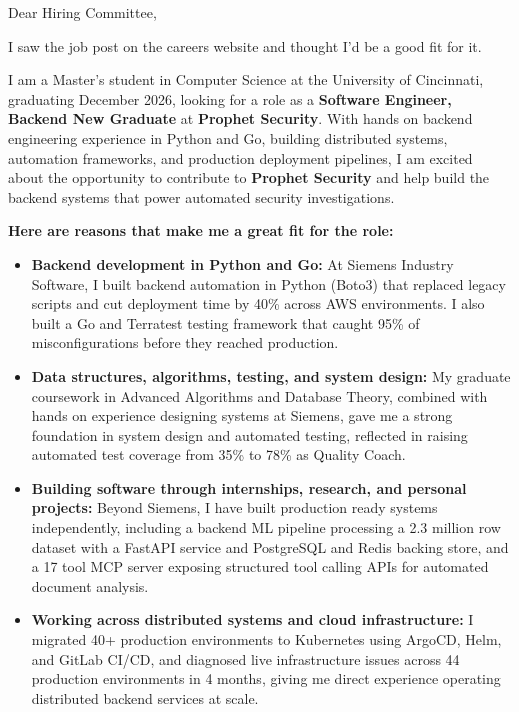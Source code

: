 \documentclass[11pt]{letter}
\date{}
\begin{document}
\begin{letter}{}

\opening{Dear Hiring Committee,}

I saw the job post on the careers website and thought I'd be a good fit for it.

I am a Master's student in Computer Science at the University of Cincinnati, graduating December 2026, looking for a role as a \textbf{Software Engineer, Backend New Graduate} at \textbf{Prophet Security}. With hands on backend engineering experience in Python and Go, building distributed systems, automation frameworks, and production deployment pipelines, I am excited about the opportunity to contribute to \textbf{Prophet Security} and help build the backend systems that power automated security investigations.

\textbf{Here are reasons that make me a great fit for the role:}

\begin{itemize}[leftmargin=*, itemsep=0.45em]
    \item \textbf{Backend development in Python and Go:} At Siemens Industry Software, I built backend automation in Python (Boto3) that replaced legacy scripts and cut deployment time by 40\% across AWS environments. I also built a Go and Terratest testing framework that caught 95\% of misconfigurations before they reached production.

    \item \textbf{Data structures, algorithms, testing, and system design:} My graduate coursework in Advanced Algorithms and Database Theory, combined with hands on experience designing systems at Siemens, gave me a strong foundation in system design and automated testing, reflected in raising automated test coverage from 35\% to 78\% as Quality Coach.

    \item \textbf{Building software through internships, research, and personal projects:} Beyond Siemens, I have built production ready systems independently, including a backend ML pipeline processing a 2.3 million row dataset with a FastAPI service and PostgreSQL and Redis backing store, and a 17 tool MCP server exposing structured tool calling APIs for automated document analysis.

    \item \textbf{Working across distributed systems and cloud infrastructure:} I migrated 40+ production environments to Kubernetes using ArgoCD, Helm, and GitLab CI/CD, and diagnosed live infrastructure issues across 44 production environments in 4 months, giving me direct experience operating distributed backend services at scale.


\end{itemize}
\end{letter}
\end{document}
